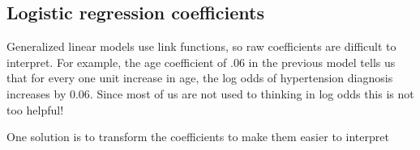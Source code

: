 \documentclass[]{book}
\newenvironment{Shaded}{\begin{snugshade}}{\end{snugshade}}
\newcommand{\KeywordTok}[1]{\textcolor[rgb]{0.13,0.29,0.53}{\textbf{#1}}}
\newcommand{\DataTypeTok}[1]{\textcolor[rgb]{0.13,0.29,0.53}{#1}}
\newcommand{\StringTok}[1]{\textcolor[rgb]{0.31,0.60,0.02}{#1}}
\newcommand{\CommentTok}[1]{\textcolor[rgb]{0.56,0.35,0.01}{\textit{#1}}}
\newcommand{\OperatorTok}[1]{\textcolor[rgb]{0.81,0.36,0.00}{\textbf{#1}}}
\newcommand{\NormalTok}[1]{#1}
\begin{document}
\begin{Shaded}
\end{Shaded}

\subsection{Logistic regression
coefficients}\label{logistic-regression-coefficients}

Generalized linear models use link functions, so raw coefficients are
difficult to interpret. For example, the age coefficient of .06 in the
previous model tells us that for every one unit increase in age, the log
odds of hypertension diagnosis increases by 0.06. Since most of us are
not used to thinking in log odds this is not too helpful!

One solution is to transform the coefficients to make them easier to
interpret

\begin{Shaded}
\end{Shaded}
\end{document}
